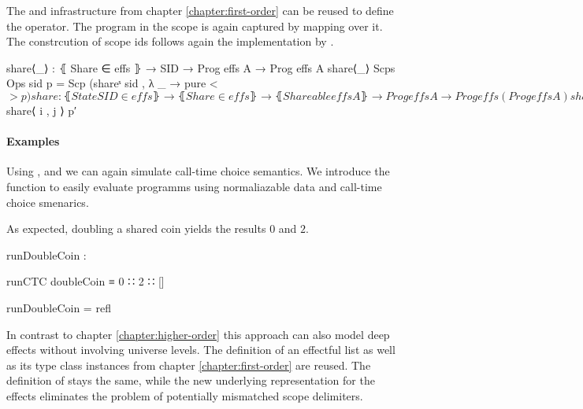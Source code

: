 The  and  infrastructure from
chapter \ref{chapter:first-order} can be reused to define the
 operator.
The program in the scope is again captured by mapping  over it.
The constrcution of scope ids follows again the implementation by
\textcite{bunkenburg2019modeling}.

\begin{code}
share⟨_⟩ : ⦃ Share ∈ effs ⦄ → SID → Prog effs A → Prog effs A
share⟨_⟩ {Scps} {Ops} sid p = Scp (shareˢ sid , λ _ → pure <$> p)

share : ⦃ State SID ∈ effs ⦄ → ⦃ Share ∈ effs ⦄ → ⦃ Shareable effs A ⦄ →
  Prog effs A → Prog effs (Prog effs A)
share {Ops} {Scps} p = do
    (i , j) ← get
    put (i + 1 , j)
    let p′ = do
          put (i , j + 1)
          x  ← p
          x′ ← shareArgs x
          put (i + 1 , j)
          pure x′
    pure $ share⟨ i , j ⟩ p′
\end{code}

\paragraph{Examples}
Using ,  and  we
can again simulate call-time choice semantics.
We introduce the function  to easily evaluate programms
using normaliazable data and call-time choice smenarics.

As expected, doubling a shared coin yields the results $0$ and $2$.
\begin{center}
\begin{code}
runDoubleCoin :
\end{code}
\begin{code}[inline]
 runCTC doubleCoin ≡ 0 ∷ 2 ∷ []
\end{code}
\begin{code}
runDoubleCoin = refl
\end{code}
\end{center}
In contrast to chapter \ref{chapter:higher-order} this approach can also model
deep effects without involving universe levels.
The definition of an effectful list as well as its type class instances from
chapter \ref{chapter:first-order} are reused.
The definition of  stays the same, while the new
underlying representation for the effects eliminates the problem of potentially
mismatched scope delimiters.

